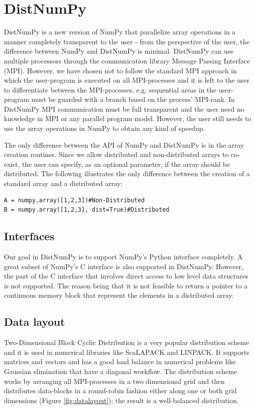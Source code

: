 \documentclass[10pt]{article}
\begin{document}
\section{DistNumPy}
DistNumPy\cite{distnumpy09} is a new version of NumPy that parallelize array operations in a manner completely transparent to the user - from the perspective of the user, the difference between NumPy and DistNumPy is minimal. DistNumPy can use multiple processors through the communication library Message Passing Interface (MPI)\cite{mpi}. However, we have chosen not to follow the standard MPI approach in which the user-program is executed on all MPI-processes and it is left to the user to differentiate between the MPI-processes, e.g. sequential areas in the user-program must be guarded with a branch based on the process' MPI-rank. In DistNumPy MPI communication must be full transparent and the user need no knowledge in MPI or any parallel program model. However, the user still needs to use the array operations in NumPy to obtain any kind of speedup.

The only difference between the API of NumPy and DistNumPy is in the array creation routines. Since we allow distributed and non-distributed arrays to co-exist, the user can specify, as an optional parameter, if the array should be distributed. The following illustrates the only difference between the creation of a standard array and a distributed array:
\lstset{frame=none, xleftmargin=0mm, numbers=none}
\begin{lstlisting}
A = numpy.array([1,2,3])#Non-Distributed
B = numpy.array([1,2,3], dist=True)#Distributed
\end{lstlisting}
\lstset{frame=single, xleftmargin=5mm, numbers=left}


\subsection{Interfaces}
Our goal in DistNumPy is to support NumPy's Python interface completely. A great subset of NumPy's C interface is also supported in DistNumPy. However, the part of the C interface that involves direct access to low level data structures is not supported. The reason being that it is not feasible to return a pointer to a continuous memory block that represent the elements in a distributed array.


\subsection{Data layout}
Two-Dimensional Block Cyclic Distribution is a very popular distribution scheme and it is used in numerical libraries like ScaLAPACK\cite{Blackford96} and LINPACK\cite{linpack79}. It supports matrices and vectors and has a good load balance in numerical problems like Gaussian elimination that have a diagonal workflow. The distribution scheme works by arranging all MPI-processes in a two dimensional grid and then distributes data-blocks in a round-robin fashion either along one or both grid dimensions (Figure \ref {fig:datalayout}); the result is a well-balanced distribution.
\end{document}
